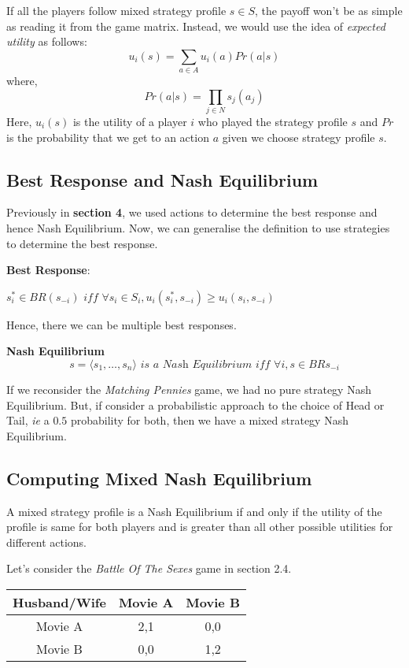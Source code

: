 If all the players follow mixed strategy profile $s \in S$, the payoff won't be as simple as reading it from the game matrix. Instead, we would use the idea of \textit{expected utility} as follows:
	$$u_i(s) = \sum_{a \in A} u_i(a) Pr(a|s)$$
	where,$$Pr(a|s) = \prod_{j \in N}s_j(a_j)$$
	Here, $u_i(s)$ is the utility of a player $i$ who played the strategy profile $s$ and $Pr$ is the probability that we get to an action $a$ given we choose strategy profile $s$.

\subsection{Best Response and Nash Equilibrium}

Previously in \textbf{section 4}, we used actions to determine the best response and hence Nash Equilibrium. Now, we can generalise the definition to use strategies to determine the best response.\newline

\begin{flushleft}\textbf{Best Response}:\\ \begin{center} $s_i^*\in BR(s_{-i})$ $iff$ $\forall s_i \in S_i, u_i(s_i^*, s_{-i}) \geq u_i(s_i, s_{-i})$\end{center}
Hence, there we can be multiple best responses.\newline

\textbf{Nash Equilibrium}
$$s = \langle s_1, \dots , s_n\rangle \textit{ is a Nash Equilibrium iff } \forall i, s \in BR{s_{-i}}$$
\end{flushleft}

If we reconsider the \textit{Matching Pennies} game, we had no pure strategy Nash Equilibrium. But, if consider a probabilistic approach to the choice of Head or Tail, \textit{ie} a $0.5$ probability for both, then we have a mixed strategy Nash Equilibrium.

\subsection{Computing Mixed Nash Equilibrium}
A mixed strategy profile is a Nash Equilibrium if and only if the utility of the profile is same for both players and is greater than all other possible utilities for different actions.\newline
\begin{flushleft}Let's consider the \textit{Battle Of The Sexes} game in section 2.4. 
\end{flushleft}
	\begin{center}
	\begin{tabular}{|c|c|c|}\hline
	Husband/Wife & Movie A & Movie B \\ \hline
	Movie A &  2,1 & 0,0 \\ \hline
	Movie B & 0,0 & 1,2 \\ \hline
	\end{tabular}
	\end{center}
	
